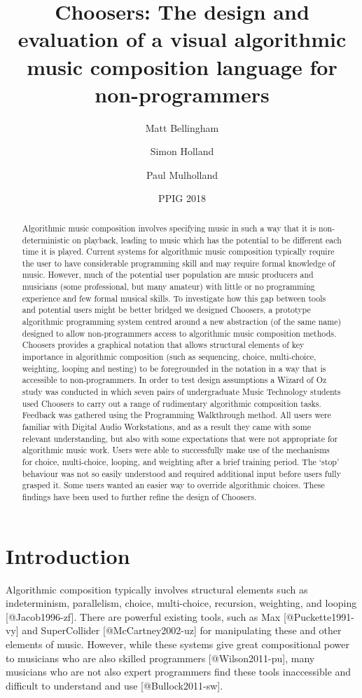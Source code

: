\documentclass[]{article}
\title{Choosers: The design and evaluation of a visual algorithmic music
composition language for non-programmers}
\author{Matt Bellingham \and Simon Holland \and Paul Mulholland}
\date{PPIG 2018}
\begin{document}
\maketitle
\begin{abstract}
Algorithmic music composition involves specifying music in such a way
that it is non-deterministic on playback, leading to music which has the
potential to be different each time it is played. Current systems for
algorithmic music composition typically require the user to have
considerable programming skill and may require formal knowledge of
music. However, much of the potential user population are music
producers and musicians (some professional, but many amateur) with
little or no programming experience and few formal musical skills. To
investigate how this gap between tools and potential users might be
better bridged we designed Choosers, a prototype algorithmic programming
system centred around a new abstraction (of the same name) designed to
allow non-programmers access to algorithmic music composition methods.
Choosers provides a graphical notation that allows structural elements
of key importance in algorithmic composition (such as sequencing,
choice, multi-choice, weighting, looping and nesting) to be foregrounded
in the notation in a way that is accessible to non-programmers. In order
to test design assumptions a Wizard of Oz study was conducted in which
seven pairs of undergraduate Music Technology students used Choosers to
carry out a range of rudimentary algorithmic composition tasks. Feedback
was gathered using the Programming Walkthrough method. All users were
familiar with Digital Audio Workstations, and as a result they came with
some relevant understanding, but also with some expectations that were
not appropriate for algorithmic music work. Users were able to
successfully make use of the mechanisms for choice, multi-choice,
looping, and weighting after a brief training period. The `stop'
behaviour was not so easily understood and required additional input
before users fully grasped it. Some users wanted an easier way to
override algorithmic choices. These findings have been used to further
refine the design of Choosers.
\end{abstract}

\hypertarget{introduction}{%
\section{Introduction}\label{introduction}}

Algorithmic composition typically involves structural elements such as
indeterminism, parallelism, choice, multi-choice, recursion, weighting,
and looping {[}@Jacob1996-zf{]}. There are powerful existing tools, such
as Max {[}@Puckette1991-vy{]} and SuperCollider {[}@McCartney2002-uz{]}
for manipulating these and other elements of music. However, while these
systems give great compositional power to musicians who are also skilled
programmers {[}@Wilson2011-pu{]}, many musicians who are not also expert
programmers find these tools inaccessible and difficult to understand
and use {[}@Bullock2011-sw{]}.
\end{document}
